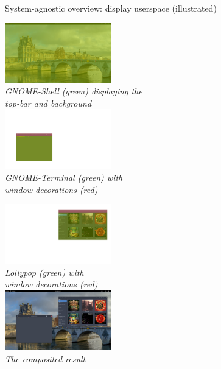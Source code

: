 \begin{frame}{System-agnostic overview: display userspace (illustrated)}

  \begin{minipage}[t]{0.49\textwidth}
    \centering
    \includegraphics[height=7em]{slides/graphics-software/compositing-gnome-shell.jpg}\\
    \textit{\small GNOME-Shell (green) displaying the\\ top-bar and background}\\
    \vspace{0.5em}
    \includegraphics[height=7em]{slides/graphics-software/compositing-gnome-terminal.jpg}\\
    \textit{\small GNOME-Terminal (green) with\\ window decorations (red)}
  \end{minipage}
  \hfill
  \begin{minipage}[t]{0.49\textwidth}
    \centering
    \includegraphics[height=7em]{slides/graphics-software/compositing-lollypop.jpg}\\
    \textit{\small Lollypop (green) with\\ window decorations (red)}\\
    \vspace{0.5em}
    \includegraphics[height=7em]{slides/graphics-software/compositing-result.jpg}\\
    \textit{\small The composited result}
  \end{minipage}
\end{frame}

